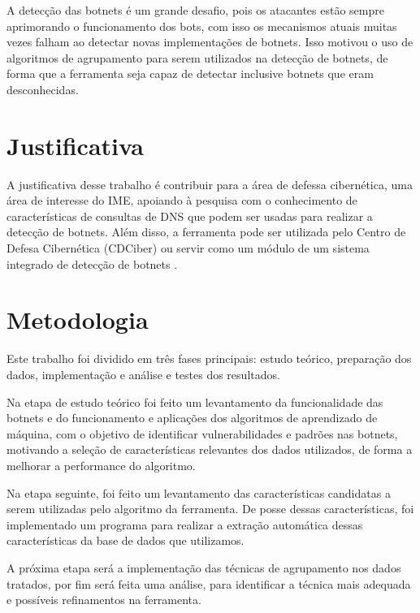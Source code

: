 A detecção das botnets é um grande desafio, pois os atacantes estão sempre aprimorando o funcionamento dos bots, com isso os mecanismos atuais muitas vezes falham ao detectar novas implementações de botnets. Isso motivou o uso de algoritmos de agrupamento para serem utilizados na detecção de botnets, de forma que a ferramenta seja capaz de detectar inclusive botnets que eram desconhecidas. 

\section{Justificativa}
A justificativa desse trabalho é contribuir para a área de defessa cibernética, uma área de interesse do IME, apoiando à pesquisa com o conhecimento de características de consultas de DNS que podem ser usadas para realizar a detecção de botnets. Além disso, a ferramenta pode ser utilizada pelo Centro de Defesa Cibernética (CDCiber) ou servir como um módulo de um sistema integrado de detecção de botnets \citep{silva2012arquitetura}.

\section{Metodologia}
Este trabalho foi dividido em três fases principais: estudo teórico, preparação dos dados, implementação e análise e testes dos resultados. 

Na etapa de estudo teórico foi feito um levantamento da funcionalidade das botnets e do funcionamento e aplicações dos algoritmos de aprendizado de máquina, com o objetivo de identificar vulnerabilidades e padrões nas botnets, motivando a seleção de características relevantes dos dados utilizados, de forma a melhorar a performance do algoritmo.

Na etapa seguinte, foi feito um levantamento das características candidatas a serem utilizadas pelo algoritmo da ferramenta. De posse dessas características, foi implementado um programa para realizar a extração automática dessas características da base de dados que utilizamos.

A próxima etapa será a implementação das técnicas de agrupamento nos dados tratados, por fim será feita uma análise, para identificar a técnica mais adequada e possíveis refinamentos na ferramenta.

